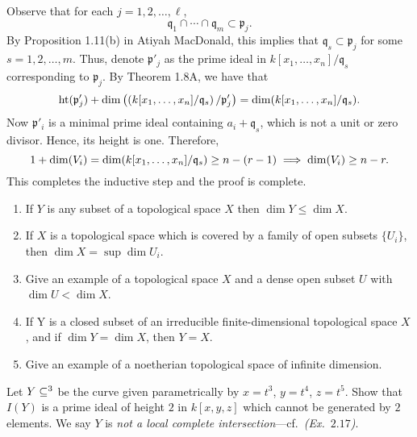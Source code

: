 \documentclass{hw_pset} %
\DeclareMathOperator{\Ht}{\rm{ht}}    %
\DeclareMathOperator{\Dim}{\rm{dim}}  %
\let\aa\relax
\DeclareMathOperator{\aa}{\mathbf{A}} %
\newcommand{\x}{x_1, \dots, x_n}    %
\newcommand{\idl}[1]{\mathfrak{#1}} %
\begin{document}
\begin{solution}
\begin{description}
        Observe that for each $j = 1, 2, \dots, {\ell}$, 
        \[
            \idl{q}_1 \cap \cdots \cap \idl{q}_{m} \subset \idl{p}_j.
        \]
        By Proposition 1.11(b) in Atiyah MacDonald, this implies that 
        $\idl{q}_s \subset \idl{p}_j$ for some $s = 1, 2, \dots, m$. 
        Thus, denote $\idl{p}'_j$ as the prime ideal in $k[\x]/\idl{q}_s$ 
        corresponding to $\idl{p}_j$. 
        By Theorem 1.8A, we have that 
        \[
            \Ht(\idl{p}'_j) + \Dim\left( \left(k[\x]/\idl{q}_s\right)/\idl{p}'_j \right)
            =
            \Dim(k[\x]/\idl{q}_s).
        \]
        Now $\idl{p}'_i$ is a minimal prime ideal containing $a_i + \idl{q}_s$, which is not a unit
        or zero divisor. Hence, its height is one. Therefore, 
        \[
            1 + \Dim(V_i) = \Dim(k[\x]/\idl{q}_s) \ge n - (r - 1)
            \implies 
            \Dim(V_i) \ge n - r.
        \]
        This completes the inductive step and the proof is complete. 
    \end{description}
\end{solution}

\begin{exercise}[1.10]
    \begin{enumerate}
        \item If $Y$ is any subset of a topological space $X$ then $\dim Y \leq \dim X$. 
        \item If $X$ is a topological space which is covered by a family of open
          subsets $\{U_{i}\}$, then $\dim X = \sup \dim U_i$.
        \item Give an example of a topological space $X$ and a dense open subset $U$
          with $\dim U < \dim X$. 
        \item If Y is a closed subset of an irreducible finite-dimensional topological space $X$, and if $\dim Y = \dim X$, then $Y= X$. 
        \item Give an example of a noetherian topological space of infinite dimension.  
    \end{enumerate}
\end{exercise}

\begin{solution}
    
\end{solution}

\begin{exercise}[1.11]
    Let $Y \subseteq \aa^3$ be the curve given parametrically by
    $x = t^3$, $y= t^4$, $z = t^5$.
    Show that $I(Y)$ is a prime ideal of height $2$ in $k[x,y,z]$ which cannot
    be generated by $2$ elements.
    We say $Y$ is \emph{not a local complete
    intersection}---cf.~\emph{(Ex.~$2.17$)}. 
\end{exercise}
\end{document}
